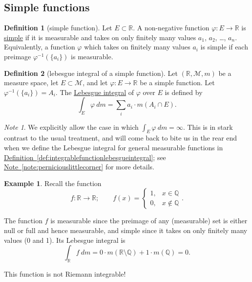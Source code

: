 \documentclass[a4paper]{scrartcl}
\newcommand{\R}{\mathbb{R}}
\newcommand{\Q}{\mathbb{Q}}
\newcommand{\defn}[1]{\ul{#1}}
\theoremstyle{definition}
\newtheorem{definition}{Definition}[section]
\newtheorem{example}{Example}[section]
\theoremstyle{plain}
\theoremstyle{remark}
\newtheorem{note}{Note}[section]
\begin{document}
\subsection{Simple functions}

\begin{definition}[simple function]
  \label{def:simplefunction}
  Let $E \subset \R$. A non-negative function $\varphi\colon E \to \R$ is \defn{simple} if it is measurable and takes on only finitely many values $a_{1}$, $a_{2}$, \ldots, $a_{n}$. Equivalently, a function $\varphi$ which takes on finitely many values $a_{i}$ is simple if each preimage $\varphi^{-1}(\{a_{i}\})$ is measurable.
\end{definition}

\begin{definition}[lebesgue integral of a simple function]
  \label{def:lebesgueintegralofsimplefunction}
  Let $(\R, \mathcal{M}, m)$ be a measure space, let $E \subset \mathcal{M}$, and let $\varphi\colon E \to \R$ be a simple function. Let $ \varphi^{-1}\left( \{ a_{i} \} \right) = A_{i}$. The \defn{Lebesgue integral} of $\varphi$ over $E$ is defined by
  \begin{equation*}
    \int_{E} \varphi\ dm = \sum_{i} a_{i}\cdot m(A_{i} \cap E).
  \end{equation*}
\end{definition}

\begin{note}
  We explicitly allow the case in which $\int_{E} \varphi\ dm = \infty$. This is in stark contrast to the usual treatment, and will come back to bite us in the rear end when we define the Lebesgue integral for general measurable functions in \hyperref[def:integrablefunctionlebesgueintegral]{Definition~\ref*{def:integrablefunctionlebesgueintegral}}; see \hyperref[note:perniciouslittlecorner]{Note~\ref*{note:perniciouslittlecorner}} for more details.
\end{note}

\begin{example}
  Recall the function
  \begin{equation*}
    f\colon \R \to \R;\qquad f(x) =
    \begin{cases}
      1, &x \in \Q \\
      0, &x \notin \Q
    \end{cases}.
  \end{equation*}

  The function $f$ is measurable since the preimage of any (measurable) set is either null or full and hence measurable, and simple since it takes on only finitely many values (0 and 1). Its Lebesgue integral is
  \begin{equation*}
    \int_{\R} f\ dm = 0\cdot m(\R \setminus \Q) + 1 \cdot m(\Q) = 0.
  \end{equation*}

  This function is not Riemann integrable!
\end{example}
\end{document}

